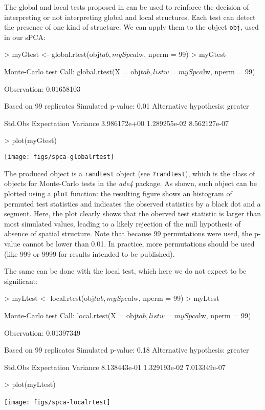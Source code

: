 \documentclass{article}
\begin{document}
The global and local tests proposed in \cite{tjart04} can
be used to reinforce the decision of interpreting or not
interpreting global and local structures.
Each test can detect the presence of one kind of structure.
We can apply them to the object \texttt{obj}, used in our sPCA:
\begin{Schunk}
\begin{Sinput}
> myGtest <- global.rtest(obj$tab, mySpca$lw, nperm = 99)
> myGtest
\end{Sinput}
\begin{Soutput}
Monte-Carlo test
Call: global.rtest(X = obj$tab, listw = mySpca$lw, nperm = 99)

Observation: 0.01658103 

Based on 99 replicates
Simulated p-value: 0.01 
Alternative hypothesis: greater 

     Std.Obs  Expectation     Variance 
3.986172e+00 1.289255e-02 8.562127e-07 
\end{Soutput}
\begin{Sinput}
> plot(myGtest)
\end{Sinput}
\end{Schunk}
\texttt{[image: figs/spca-globalrtest]}

\noindent The produced object is a \texttt{randtest} object (see
\texttt{?randtest}), which is the class of objects for Monte-Carlo
tests in the \textit{ade4} package.
As shown, such object can be plotted using a \texttt{plot} function:
the resulting figure shows an histogram of permuted test statistics
and indicates the observed statistics by a black dot and a segment.
Here, the plot clearly shows that the oberved test statistic is larger
than most simulated values, leading to a likely rejection of
the null hypothesis of absence of spatial structure.
Note that because 99 permutations were used, the p-value cannot be
lower than 0.01.
In practice, more permutations should be used (like 999 or 9999 for results
intended to be published).

The same can be done with the local test, which here we do not expect
to be significant:
\begin{Schunk}
\begin{Sinput}
> myLtest <- local.rtest(obj$tab, mySpca$lw, nperm = 99)
> myLtest
\end{Sinput}
\begin{Soutput}
Monte-Carlo test
Call: local.rtest(X = obj$tab, listw = mySpca$lw, nperm = 99)

Observation: 0.01397349 

Based on 99 replicates
Simulated p-value: 0.18 
Alternative hypothesis: greater 

     Std.Obs  Expectation     Variance 
8.138443e-01 1.329193e-02 7.013349e-07 
\end{Soutput}
\begin{Sinput}
> plot(myLtest)
\end{Sinput}
\end{Schunk}
\texttt{[image: figs/spca-localrtest]}
~\\
\end{document}
